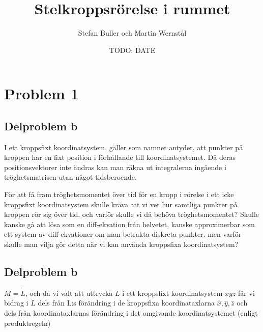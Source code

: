 \documentclass[12pt,a4paper]{article}
\begin{document}

\title{Stelkroppsrörelse i rummet}
	\author{Stefan Buller och Martin Wernstål}
	\date{TODO: DATE}
	\maketitle{}
	\thispagestyle{empty}

	\begin{abstract}
		
	\end{abstract}

\newpage{}

	\tableofcontents{}
	\thispagestyle{empty}

\newpage{}

	\setcounter{page}{1}
	\pagestyle{plain}
	
	
\section{Problem 1}
	\subsection{Delproblem b}
	I ett kroppsfixt koordinatsystem, gäller som namnet antyder, att punkter på kroppen
	har en fixt position i förhållande till koordinatsystemet. Då deras positionsvektorer
	inte ändras kan man räkna ut integralerna ingående i tröghetsmatrisen utan något tidsberoende.
	
	För att få fram tröghetsmomentet över tid för en kropp i rörelse i ett icke kroppsfixt
	koordinatsystem skulle kräva att vi vet hur samtliga punkter på kroppen rör sig över tid,
	och varför skulle vi då behöva tröghetsmomentet?
	Skulle kanske gå att lösa som en diff-ekvation från helvetet, kanske approximerbar som ett
	system av diff-ekvationer om man betrakta diskreta punkter. men varför skulle man vilja gör
	detta när vi kan använda kroppsfixa koordinatsystem?

	\subsection{Delproblem b}
	$M = \dot{L}$, och då vi valt att uttrycka $L$ i ett kroppsfixt koordinatsystem $xyz$ får vi
	bidrag i $\dot{L}$ dels från L:s förändring i de kroppsfixa koordinataxlarna
	$\hat{x},\hat{y},\hat{z}$ och dels från koordinataxlarnas förändring i det omgivande
	koordinatsystemet (enligt produktregeln)
	
\end{document}
